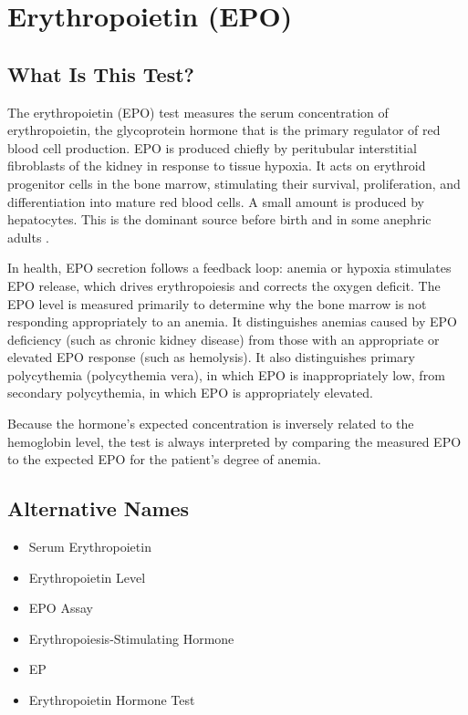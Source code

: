\chapter{Erythropoietin (EPO)}

\section*{What Is This Test?}
The erythropoietin (EPO) test measures the serum concentration of erythropoietin, the glycoprotein hormone that is the primary regulator of red blood cell production. EPO is produced chiefly by peritubular interstitial fibroblasts of the kidney in response to tissue hypoxia. It acts on erythroid progenitor cells in the bone marrow, stimulating their survival, proliferation, and differentiation into mature red blood cells. A small amount is produced by hepatocytes. This is the dominant source before birth and in some anephric adults \cite{brugnara2015erythropoietin}.

In health, EPO secretion follows a feedback loop: anemia or hypoxia stimulates EPO release, which drives erythropoiesis and corrects the oxygen deficit. The EPO level is measured primarily to determine why the bone marrow is not responding appropriately to an anemia. It distinguishes anemias caused by EPO deficiency (such as chronic kidney disease) from those with an appropriate or elevated EPO response (such as hemolysis). It also distinguishes primary polycythemia (polycythemia vera), in which EPO is inappropriately low, from secondary polycythemia, in which EPO is appropriately elevated.

Because the hormone's expected concentration is inversely related to the hemoglobin level, the test is always interpreted by comparing the measured EPO to the expected EPO for the patient's degree of anemia.

\section*{Alternative Names}
\begin{itemize}
  \item Serum Erythropoietin
  \item Erythropoietin Level
  \item EPO Assay
  \item Erythropoiesis-Stimulating Hormone
  \item EP
  \item Erythropoietin Hormone Test
\end{itemize}

